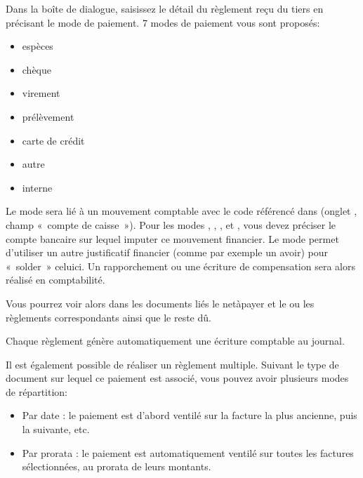 \documentclass[a4paper,10pt,oneside,french]{sphinxmanual}
\begin{document}
\sphinxAtStartPar
Dans la boîte de dialogue, saisissez le détail du règlement reçu du tiers en précisant le mode de paiement.
7 modes de paiement vous sont proposés:
\begin{itemize}
\item {} 
\sphinxAtStartPar
espèces

\item {} 
\sphinxAtStartPar
chèque

\item {} 
\sphinxAtStartPar
virement

\item {} 
\sphinxAtStartPar
prélèvement

\item {} 
\sphinxAtStartPar
carte de crédit

\item {} 
\sphinxAtStartPar
autre

\item {} 
\sphinxAtStartPar
interne

\end{itemize}

\sphinxAtStartPar
Le mode  sera lié à un mouvement comptable avec le code référencé dans  (onglet , champ « compte de caisse »).
Pour les modes , , ,  et , vous devez préciser le compte bancaire sur lequel imputer ce mouvement financier.
Le mode  permet d’utiliser un autre justificatif financier (comme par exemple un avoir) pour « solder » celui\sphinxhyphen{}ci. Un rapporchement ou une écriture de compensation sera alors réalisé en comptabilité.

\sphinxAtStartPar
Vous pourrez voir alors dans les documents liés le net\sphinxhyphen{}à\sphinxhyphen{}payer et le ou les règlements correspondants ainsi que le reste dû.

\sphinxAtStartPar
Chaque règlement génère automatiquement une écriture comptable au journal.

\sphinxAtStartPar
Il est également possible de réaliser un règlement multiple.
Suivant le type de document sur lequel ce paiement est associé, vous pouvez avoir plusieurs modes de répartition:
\begin{itemize}
\item {} 
\sphinxAtStartPar
Par date : le paiement est d’abord ventilé sur la facture la plus ancienne, puis la suivante, etc.

\item {} 
\sphinxAtStartPar
Par prorata : le paiement est automatiquement ventilé sur toutes les factures sélectionnées, au prorata de leurs montants.
\begin{quote}

\noindent{}
\end{quote}

\end{itemize}
\end{document}

